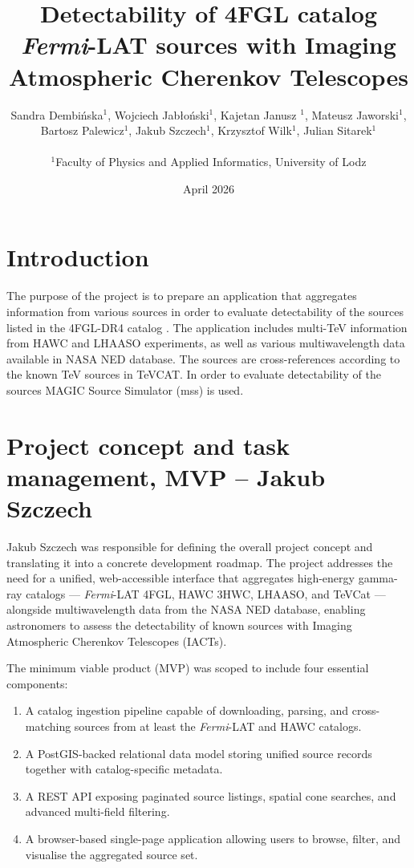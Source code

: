 \documentclass[11pt, a4paper]{article}
\title{Detectability of 4FGL catalog \textit{Fermi}-LAT sources with Imaging Atmospheric Cherenkov Telescopes}
\author{Sandra Dembińska$^1$, Wojciech Jabłoński$^1$, Kajetan Janusz $^1$, Mateusz Jaworski$^1$,\\
Bartosz Palewicz$^1$, Jakub Szczech$^1$, Krzysztof Wilk$^1$, Julian Sitarek$^1$\\
\\
$^1$Faculty of Physics and Applied Informatics, University of Lodz
}
\date{April 2026}
\begin{document}
\maketitle

\section{Introduction}
The purpose of the project is to prepare an application that aggregates information from various sources in order to evaluate detectability of the sources listed in the 4FGL-DR4 catalog \citep{2020ApJS..247...33A}.
The application includes multi-TeV information from HAWC and LHAASO experiments, as well as various multiwavelength data available in NASA NED database.
The sources are cross-references according to the known TeV sources in TeVCAT.
In order to evaluate detectability of the sources MAGIC Source Simulator (mss) is used.

\section{Project concept and task management, MVP -- Jakub Szczech}

Jakub Szczech was responsible for defining the overall project concept and translating it into a concrete development roadmap.
The project addresses the need for a unified, web-accessible interface that aggregates high-energy gamma-ray catalogs — \textit{Fermi}-LAT 4FGL, HAWC 3HWC, LHAASO, and TeVCat — alongside multiwavelength data from the NASA NED database, enabling astronomers to assess the detectability of known sources with Imaging Atmospheric Cherenkov Telescopes (IACTs).

The minimum viable product (MVP) was scoped to include four essential components:
\begin{enumerate}
    \item A catalog ingestion pipeline capable of downloading, parsing, and cross-matching sources from at least the \textit{Fermi}-LAT and HAWC catalogs.
    \item A PostGIS-backed relational data model storing unified source records together with catalog-specific metadata.
    \item A REST API exposing paginated source listings, spatial cone searches, and advanced multi-field filtering.
    \item A browser-based single-page application allowing users to browse, filter, and visualise the aggregated source set.
\end{enumerate}
\end{document}
